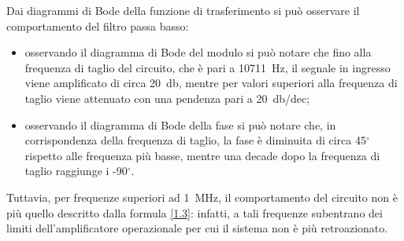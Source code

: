 Dai diagrammi di Bode della funzione di trasferimento si può osservare il comportamento del filtro passa basso:
\begin{itemize}
	\item osservando il diagramma di Bode del modulo si può notare che fino alla frequenza di taglio del circuito, che è pari a \SI{10711}{\hertz}, il segnale in ingresso viene amplificato di circa \SI{20}{\decibel}, mentre per valori superiori alla frequenza di taglio viene attenuato con una pendenza pari a \SI{20}{\decibel}/dec;
	\item osservando il diagramma di Bode della fase si può notare che, in corrispondenza della frequenza di taglio, la fase è diminuita di circa 45$^{\circ}$rispetto alle frequenza più basse, mentre una decade dopo la frequenza di taglio raggiunge i -90$^{\circ}$.
\end{itemize}

Tuttavia, per frequenze superiori ad \SI{1}{\mega\hertz}, il comportamento del circuito non è più quello descritto dalla formula \ref{1.3}: infatti, a tali frequenze subentrano dei limiti dell'amplificatore operazionale per cui il sistema non è più retroazionato. 



